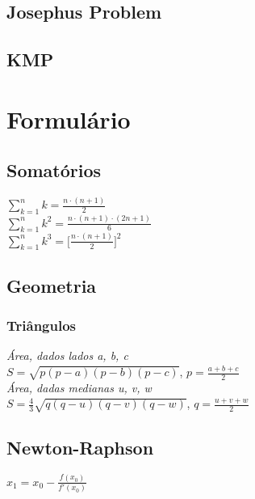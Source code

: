 \documentclass[12pt,a4paper]{article}
\begin{document}
		\subsection{Josephus Problem}
			
		\subsection{KMP}
			

	\twocolumn
	\section{Formulário}
		\subsection*{Somatórios}
			\( \sum_{k = 1}^{n} k = \frac{n \cdot (n + 1)}{2} \) \\
			\( \sum_{k = 1}^{n} k^2 = \frac{n \cdot (n + 1) \cdot (2n + 1)}{6} \) \\
			\( \sum_{k = 1}^{n} k^3 = \big[\frac{n \cdot (n + 1)}{2}\big]^2 \)
		\subsection*{Geometria}
			\subsubsection*{Triângulos}
				\emph{Área, dados lados a, b, c} \\
				\( S = \sqrt{p (p - a) (p - b) (p - c)} \), \( p = \frac{a + b + c}{2} \) \\
				\emph{Área, dadas medianas u, v, w} \\
				\( S = \frac{4}{3} \sqrt{q (q - u) (q - v) (q - w)} \), \( q = \frac{u + v + w}{2} \)
		\subsection*{Newton-Raphson}
				\( x_1 = x_0 - \frac{f(x_0)}{f'(x_0)} \)

	\onecolumn
\end{document}
